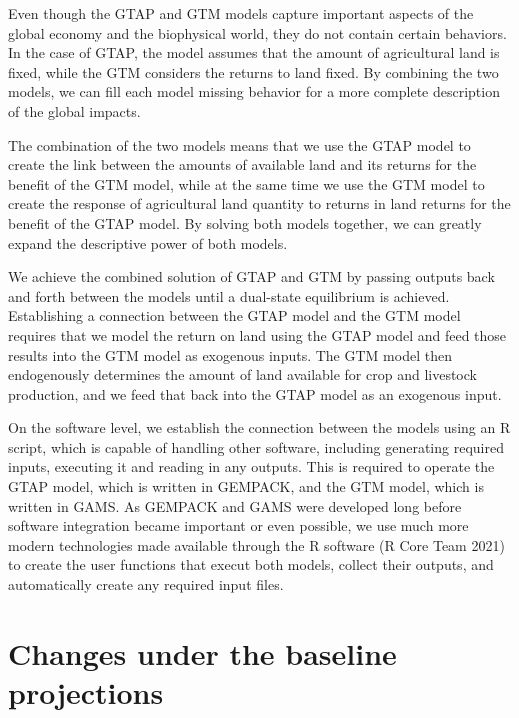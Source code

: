 \documentclass[
]{article}
\begin{document}
Even though the GTAP and GTM models capture important aspects of the global economy and the biophysical world, they do not contain certain behaviors. In the case of GTAP, the model assumes that the amount of agricultural land is fixed, while the GTM considers the returns to land fixed. By combining the two models, we can fill each model missing behavior for a more complete description of the global impacts.

The combination of the two models means that we use the GTAP model to create the link between the amounts of available land and its returns for the benefit of the GTM model, while at the same time we use the GTM model to create the response of agricultural land quantity to returns in land returns for the benefit of the GTAP model. By solving both models together, we can greatly expand the descriptive power of both models.

We achieve the combined solution of GTAP and GTM by passing outputs back and forth between the models until a dual-state equilibrium is achieved. Establishing a connection between the GTAP model and the GTM model requires that we model the return on land using the GTAP model and feed those results into the GTM model as exogenous inputs. The GTM model then endogenously determines the amount of land available for crop and livestock production, and we feed that back into the GTAP model as an exogenous input.

On the software level, we establish the connection between the models using an R script, which is capable of handling other software, including generating required inputs, executing it and reading in any outputs. This is required to operate the GTAP model, which is written in GEMPACK, and the GTM model, which is written in GAMS. As GEMPACK and GAMS were developed long before software integration became important or even possible, we use much more modern technologies made available through the R software (R Core Team 2021) to create the user functions that execut both models, collect their outputs, and automatically create any required input files.

\hypertarget{changes-under-the-baseline-projections}{%
\section{Changes under the baseline projections}\label{changes-under-the-baseline-projections}}
\end{document}
